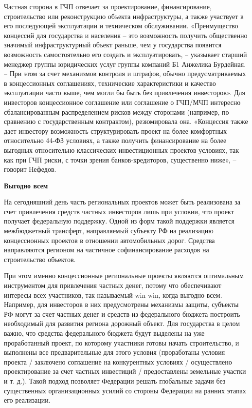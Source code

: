 Частная сторона в ГЧП отвечает за проектирование, финансирование, строительство или реконструкцию объекта инфраструктуры, а также участвует в его последующей эксплуатации и техническом обслуживании. «Преимущество концессий для государства и населения – это возможность получить общественно значимый инфраструктурный объект раньше, чем у государства появится возможность самостоятельно его создать и эксплуатировать, – указывает старший менеджер группы юридических услуг группы компаний Б1 Анжелика Бурдейная. – При этом за счет механизмов контроля и штрафов, обычно предусматриваемых в концессионных соглашениях, технические характеристики и качество эксплуатации часто выше, чем могли бы быть без привлечения инвесторов». Для инвесторов концессионное соглашение или соглашение о ГЧП/МЧП интересно сбалансированным распределением рисков между сторонами (например, по сравнению с государственным контрактом), резюмировала она. «Концессия также дает инвестору возможность структурировать проект на более комфортных относительно 44-ФЗ условиях, а также получить финансирование на более выгодных относительно классических инвестиционных проектов условиях, так как при ГЧП риски, с точки зрения банков-кредиторов, существенно ниже», – говорит Нефедов.

\textbf{Выгодно всем}

На сегодняшний день часть региональных проектов может быть реализована за счет привлечения средств частных инвесторов лишь при условии, что проект получает федеральную поддержку. Одной из форм такой поддержки является межбюджетный трансферт, направляемый субъекту РФ на реализацию концессионных проектов в отношении автомобильных дорог. Средства направляются регионом на частичное софинансирование расходов на строительство объектов.

При этом именно концессионные региональные проекты являются оптимальным инструментом для привлечения частных денег, потому что обеспечивают интересы всех участников, так называемый win-win, когда выгодно всем. Например, для инвесторов в них предусмотрены механизмы защиты, субъекты РФ могут за счет частных денег и средств из федерального бюджета построить необходимый для развития региона дорожный объект. Для государства в целом важно, что средства федерального бюджета будут выделены на уже проработанный проект, по которому участники готовы начать строительство, и выполнены все предварительные для этого условия (проработаны условия проекта / заключено соглашение на конкурентных условиях / осуществлено проектирование за счет частных инвестиций / предоставлены земельные участки и т. д.). Такой подход позволяет Федерации решать глобальные задачи без существенных организационных усилий со стороны Федерации на ранних этапах его реализации.

